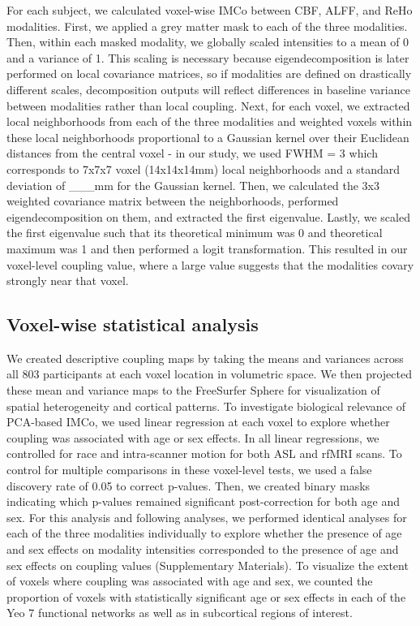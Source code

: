 \documentclass[
  12pt,
]{article}
\begin{document}
For each subject, we calculated voxel-wise IMCo between CBF, ALFF, and ReHo modalities. First, we applied a grey matter mask to each of the three modalities. Then, within each masked modality, we globally scaled intensities to a mean of 0 and a variance of 1. This scaling is necessary because eigendecomposition is later performed on local covariance matrices, so if modalities are defined on drastically different scales, decomposition outputs will reflect differences in baseline variance between modalities rather than local coupling. Next, for each voxel, we extracted local neighborhoods from each of the three modalities and weighted voxels within these local neighborhoods proportional to a Gaussian kernel over their Euclidean distances from the central voxel - in our study, we used FWHM = 3 which corresponds to 7x7x7 voxel (14x14x14mm) local neighborhoods and a standard deviation of \_\_\_mm for the Gaussian kernel. Then, we calculated the 3x3 weighted covariance matrix between the neighborhoods, performed eigendecomposition on them, and extracted the first eigenvalue. Lastly, we scaled the first eigenvalue such that its theoretical minimum was 0 and theoretical maximum was 1 and then performed a logit transformation. This resulted in our voxel-level coupling value, where a large value suggests that the modalities covary strongly near that voxel.

\hypertarget{voxel-wise-statistical-analysis}{%
\subsection{Voxel-wise statistical analysis}\label{voxel-wise-statistical-analysis}}

We created descriptive coupling maps by taking the means and variances across all 803 participants at each voxel location in volumetric space. We then projected these mean and variance maps to the FreeSurfer Sphere for visualization of spatial heterogeneity and cortical patterns.
To investigate biological relevance of PCA-based IMCo, we used linear regression at each voxel to explore whether coupling was associated with age or sex effects. In all linear regressions, we controlled for race and intra-scanner motion for both ASL and rfMRI scans. To control for multiple comparisons in these voxel-level tests, we used a false discovery rate of 0.05 to correct p-values. Then, we created binary masks indicating which p-values remained significant post-correction for both age and sex. For this analysis and following analyses, we performed identical analyses for each of the three modalities individually to explore whether the presence of age and sex effects on modality intensities corresponded to the presence of age and sex effects on coupling values (Supplementary Materials).
To visualize the extent of voxels where coupling was associated with age and sex, we counted the proportion of voxels with statistically significant age or sex effects in each of the Yeo 7 functional networks as well as in subcortical regions of interest.
\end{document}
